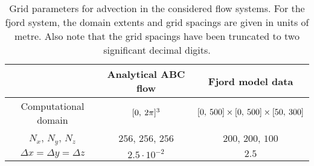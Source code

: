 \begin{table}[htpb]
    \centering
    \caption[Grid parameters for advection in the considered flow systems]
    {Grid parameters for advection in the considered flow systems. For the
        fjord system, the domain extents and grid spacings are given in
    units of metre. Also note that the grid spacings have been truncated
to two significant decimal digits.}
    \label{tab:gridparams}
    \begin{tabular}{ccc}
        \toprule
        & Analytical ABC flow & Fjord model data\\
        \midrule
        Computational domain & $[0,\hspace{0.5ex}2\pi]^{3}$ & $[0,\hspace{0.5ex}500]\times[0,\hspace{0.5ex}500]\times[50,\hspace{0.5ex}300]$\\
        $N_{x}$, $N_{y}$, $N_{z}$ & $256$, $256$, $256$ & $200$, $200$, $100$\\
        $\Delta{x} = \Delta{y} = \Delta{z}$ & $2.5\cdot10^{-2}$ & $2.5$\\
        \bottomrule
    \end{tabular}
\end{table}
